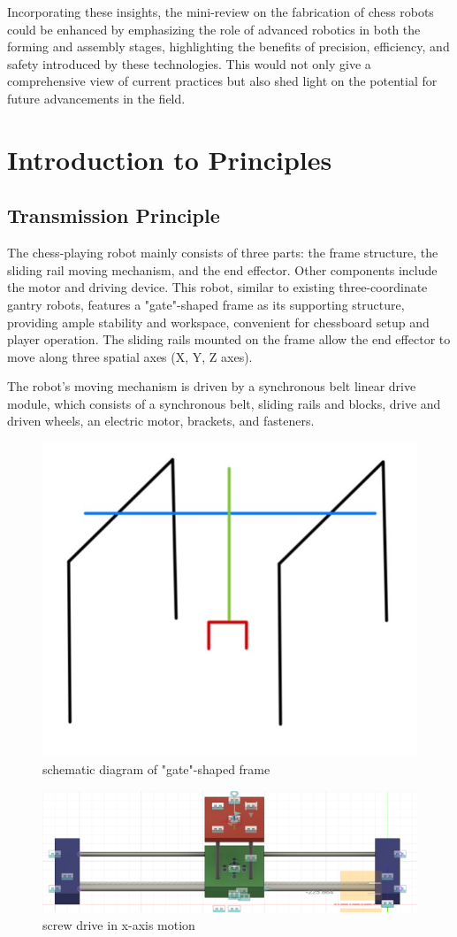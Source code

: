 \documentclass[10pt, a4paper, twocolumn]{article}
\begin{document}
Incorporating these insights, the mini-review on the fabrication of chess robots could be enhanced by emphasizing the role of advanced robotics in both the forming and assembly stages, highlighting the benefits of precision, efficiency, and safety introduced by these technologies. This would not only give a comprehensive view of current practices but also shed light on the potential for future advancements in the field.

\section{Introduction to Principles}
\subsection{Transmission Principle}
The chess-playing robot mainly consists of three parts: the frame structure, the sliding rail moving mechanism, and the end effector. Other components include the motor and driving device. This robot, similar to existing three-coordinate gantry robots, features a "gate"-shaped frame as its supporting structure, providing ample stability and workspace, convenient for chessboard setup and player operation. The sliding rails mounted on the frame allow the end effector to move along three spatial axes (X, Y, Z axes).

The robot's moving mechanism is driven by a synchronous belt linear drive module, which consists of a synchronous belt, sliding rails and blocks, drive and driven wheels, an electric motor, brackets, and fasteners.

\begin{figure}
    \centering
    \includegraphics[width=0.5\linewidth]{schematic diagram.jpg}
    \caption{schematic diagram of "gate"-shaped frame}
    \label{fig:schematic diagram}
\end{figure}

\begin{figure}
    \centering
    \includegraphics[width=0.8\linewidth]{screw drive in x-axis motion.png}
    \caption{screw drive in x-axis motion}
    \label{fig:screw drive in x-axis motion}
\end{figure}
\end{document}
